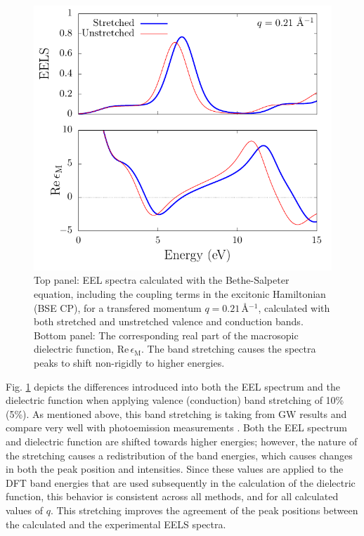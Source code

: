 \documentclass[aps,prb,10pt,showpacs,superscriptaddress,twocolumn,notitlepage]{revtex4-1}
\begin{document}
\begin{figure}[b]
\includegraphics[width=\linewidth]{fig03}
\caption{Top panel: 
EEL spectra calculated with the Bethe-Salpeter equation, including the coupling
terms in the excitonic Hamiltonian (BSE CP), for a transfered momentum
$q = 0.21$\,\r{A}$^{-1}$, calculated with
both stretched and unstretched valence and conduction bands.
Bottom panel: The corresponding real part of the
macrosopic
dielectric function,
$\mathrm{Re}\,\epsilon_{\mathrm{M}}$. The band stretching causes the spectra
peaks to shift non-rigidly to higher energies.}
\label{fig:stretching}
\end{figure}

Fig. \ref{fig:stretching} depicts the differences introduced into both the EEL
spectrum and the dielectric function when applying valence (conduction) band
stretching of 10\% (5\%). As mentioned above, this band stretching is taking
from GW results \cite{olevano} and compare very well with photoemission
measurements \cite{heskePRB99, marinopoulosPRB04}. Both the EEL spectrum and
dielectric function are shifted towards higher energies; however, the nature of
the stretching causes a redistribution of the band energies, which causes
changes in both the peak position and intensities. Since these values are
applied to the DFT band energies that are used subsequently in the calculation
of the dielectric function, this behavior is consistent across all methods, and
for all calculated values of $q$. This stretching improves the
agreement of the peak positions between the calculated and the experimental EELS
spectra.
\end{document}
